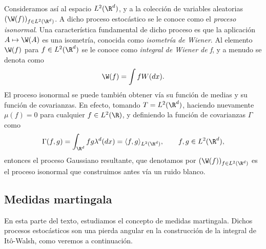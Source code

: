 \begin{ejem}
Consideramos así al espacio $L^{2}(\R^{d})$, y a la colección de variables aleatorias $(\W(f))_{f\in L^{2}(\R^{d})}$. A dicho proceso estocástico se le conoce como el \textit{proceso isonormal}. Una característica fundamental de dicho proceso es que la aplicación $A\mapsto\W(A)$ es una isometría, conocida como \textit{isometría de Wiener}. Al elemento $\W(f)$ para $f\in L^2(\R^{d})$ se le conoce como \textit{integral de Wiener de f}, y a menudo se denota como
\[
\W(f)=\int f W(dx).    
\] 
El proceso isonormal se puede también obtener vía su función de medias y su función de covarianzas. En efecto, tomando $T=L^{2}(\R^{d})$, haciendo nuevamente $\mu(f)=0$ para cualquier $f\in L^2(\R)$, y definiendo la función de covarianzas $\Gamma$ como
\[
\Gamma(f,g)=\int_{\R^d}fg \lambda^d(dx)=\langle f,g\rangle_{L^{2}(\R^{d})}, \qquad f,g\in L^2(\R^{d}),
\]
entonces el proceso Gaussiano resultante, que denotamos por $(\W(f))_{f\in L^{2}(\R^{d})}$ es el proceso isonormal que construimos antes vía un ruido blanco. 
 \end{ejem}

\subsection{Medidas martingala}

En esta parte del texto, estudiamos el concepto de medidas martingala. Dichos procesos estocásticos son una pierda angular en la construcción de la integral de Itô-Walsh, como veremos a continuación.

